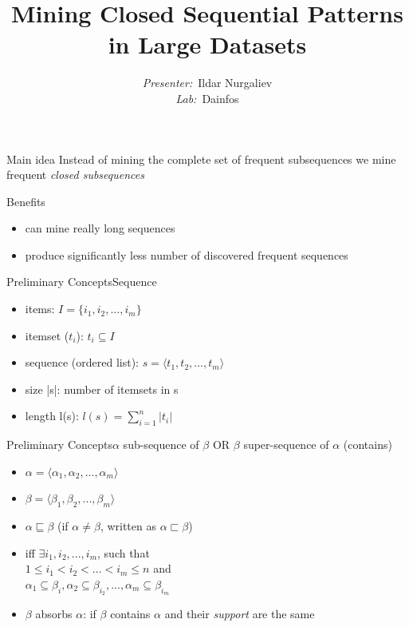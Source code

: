 \documentclass[12pt]{beamer}
\title{\fontsize{15}{15}\selectfont
	\textbf{Mining Closed Sequential Patterns in Large Datasets
}}
\author{
	\fontvi
	\small{%
\emph{Presenter:}~Ildar Nurgaliev\\%
\emph{Lab:}~Dainfos}\\%
}
\date{}
\begin{document}
\maketitle

\begin{frame}{Main idea}
  Instead of mining the complete set of frequent subsequences we mine frequent \textit{closed subsequences}
\end{frame}

\begin{frame}{Benefits}
\begin{itemize}
\item can mine really long sequences
\item produce significantly less number of discovered frequent sequences
\end{itemize}
\end{frame}

\begin{frame}{Preliminary Concepts}{Sequence}
\begin{itemize}
\item items: $\textit{I} = \{i_1, i_2, ..., i_m\}$
\item itemset ($t_i$): $t_i \subseteq \textit{I}$
\item sequence (ordered list): $s = \langle t_1, t_2, ..., t_m \rangle$
\item size |s|: number of itemsets in s
\item length l(s): $l(s)=\sum\limits_{i=1}^n |t_i|$
\end{itemize}
\end{frame}

\begin{frame}{Preliminary Concepts}{$\alpha$ sub-sequence of $\beta$ OR $\beta$ super-sequence of $\alpha$ (contains)}
\begin{itemize}
\item $\alpha = \langle \alpha_1, \alpha_2, ..., \alpha_m \rangle$
\item $\beta = \langle \beta_1, \beta_2, ..., \beta_m \rangle$
\item $\alpha \sqsubseteq \beta$ (if $\alpha \neq \beta$, written as $\alpha \sqsubset \beta$)
\item iff $\exists i_1, i_2,...,i_m$, such that\\ $1 \leq i_1 < i_2 < ... < i_m \leq n$ and\\ $\alpha_1 \subseteq \beta_i,\alpha_2 \subseteq \beta_{i_2},...,\alpha_m \subseteq \beta_{i_m}$
\item $\beta$ absorbs $\alpha$: if $\beta$ contains $\alpha$ and their \textit{support} are the same
\end{itemize}
\end{frame}
\end{document}
